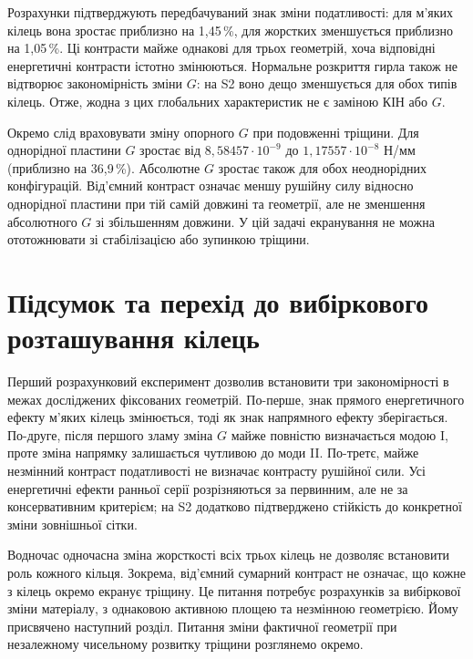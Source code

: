 Розрахунки підтверджують передбачуваний знак зміни податливості: для м'яких кілець вона зростає приблизно на 1,45\,\%, для жорстких зменшується приблизно на 1,05\,\%. Ці контрасти майже однакові для трьох геометрій, хоча відповідні енергетичні контрасти істотно змінюються. Нормальне розкриття гирла також не відтворює закономірність зміни $G$: на S2 воно дещо зменшується для обох типів кілець. Отже, жодна з цих глобальних характеристик не є заміною КІН або $G$.

Окремо слід враховувати зміну опорного $G$ при подовженні тріщини. Для однорідної пластини $G$ зростає від $8{,}58457\cdot10^{-9}$ до $1{,}17557\cdot10^{-8}$ Н/мм (приблизно на 36,9\,\%). Абсолютне $G$ зростає також для обох неоднорідних конфігурацій. Від'ємний контраст означає меншу рушійну силу відносно однорідної пластини при тій самій довжині та геометрії, але не зменшення абсолютного $G$ зі збільшенням довжини. У цій задачі екранування не можна ототожнювати зі стабілізацією або зупинкою тріщини.

\section{Підсумок та перехід до вибіркового розташування кілець}
\label{sec:fixed-summary}

Перший розрахунковий експеримент дозволив встановити три закономірності в межах досліджених фіксованих геометрій. По-перше, знак прямого енергетичного ефекту м'яких кілець змінюється, тоді як знак напрямного ефекту зберігається. По-друге, після першого зламу зміна $G$ майже повністю визначається модою I, проте зміна напрямку залишається чутливою до моди II. По-третє, майже незмінний контраст податливості не визначає контрасту рушійної сили. Усі енергетичні ефекти ранньої серії розрізняються за первинним, але не за консервативним критерієм; на S2 додатково підтверджено стійкість до конкретної зміни зовнішньої сітки.

Водночас одночасна зміна жорсткості всіх трьох кілець не дозволяє встановити роль кожного кільця. Зокрема, від'ємний сумарний контраст не означає, що кожне з кілець окремо екранує тріщину. Це питання потребує розрахунків за вибіркової зміни матеріалу, з однаковою активною площею та незмінною геометрією. Йому присвячено наступний розділ. Питання зміни фактичної геометрії при незалежному чисельному розвитку тріщини розглянемо окремо.
